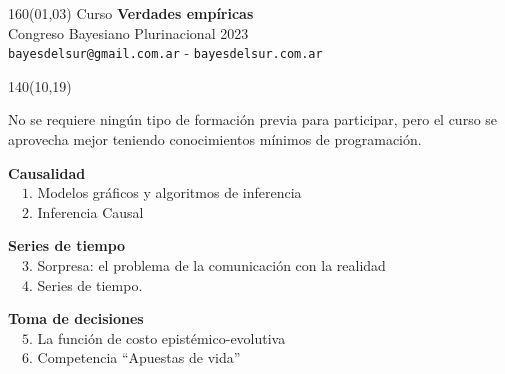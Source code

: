 \documentclass[shownotes,aspectratio=169]{beamer}
\begin{document}
\begin{frame}

\begin{textblock}{160}(01,03)\centering
\textcolor{black!85}{{\large
\large Curso \textbf{Verdades empíricas} \\[-0.1cm] \footnotesize Congreso Bayesiano Plurinacional 2023}} \\ \scriptsize \texttt{bayesdelsur@gmail.com.ar} - \texttt{bayesdelsur.com.ar}
\end{textblock}



\begin{textblock}{140}(10,19)

\normalsize
 No se requiere ningún tipo de formación previa para participar, pero el curso se aprovecha mejor teniendo conocimientos mínimos de programación.

\vspace{0.3cm}


\normalsize \textbf{Causalidad} \\[0.1cm] \footnotesize
\ \ $1$. Modelos gráficos y algoritmos de inferencia \\
\ \ $2$. Inferencia Causal\\

 \vspace{0.3cm}

\normalsize \textbf{Series de tiempo} \\[0.1cm] \footnotesize
\ \ $3$. Sorpresa: el problema de la comunicación con la realidad \\
\ \ $4$. Series de tiempo. \\

\vspace{0.3cm}

\normalsize \textbf{Toma de decisiones} \\[0.1cm] \footnotesize
\ \ $5$. La función de costo epistémico-evolutiva \\
\ \ $6$. Competencia ``Apuestas de vida'' \\

\end{textblock}

\end{frame}
\end{document}
